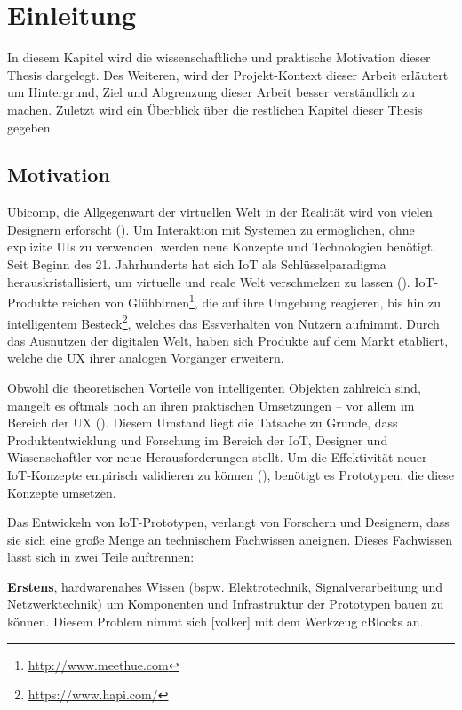 \chapter{Einleitung}\label{sec:1_einleitung}
In diesem Kapitel wird die wissenschaftliche und praktische Motivation dieser Thesis dargelegt. Des Weiteren, wird der Projekt-Kontext dieser Arbeit erläutert um Hintergrund, Ziel und Abgrenzung dieser Arbeit besser verständlich zu machen. Zuletzt wird ein Überblick über die restlichen Kapitel dieser Thesis gegeben.

\section{Motivation}\label{sec:1_motivation}
\ac{Ubicomp}, die Allgegenwart der virtuellen Welt in der Realität wird von vielen Designern erforscht (\cite{Kuniavsky.2010}). Um Interaktion mit Systemen zu ermöglichen, ohne explizite \acp{UI} zu verwenden, werden neue Konzepte und Technologien benötigt. Seit Beginn des 21. Jahrhunderts hat sich \ac{IoT} als Schlüsselparadigma herauskristallisiert, um virtuelle und reale Welt verschmelzen zu lassen (\cite{Gubbi.2013}). \ac{IoT}-Produkte reichen von Glühbirnen\footnote{\url{http://www.meethue.com}}, die auf ihre Umgebung reagieren, bis hin zu intelligentem Besteck\footnote{\url{https://www.hapi.com/}}, welches das Essverhalten von Nutzern aufnimmt. Durch das Ausnutzen der digitalen Welt, haben sich Produkte auf dem Markt etabliert, welche die \ac{UX} ihrer analogen Vorgänger erweitern.

Obwohl die theoretischen Vorteile von intelligenten Objekten zahlreich sind, mangelt es oftmals noch an ihren praktischen Umsetzungen -- vor allem im Bereich der \ac{UX} (\cite{Resnick.2013}). Diesem Umstand liegt die Tatsache zu Grunde, dass Produktentwicklung und Forschung im Bereich der \ac{IoT}, Designer und Wissenschaftler vor neue Herausforderungen stellt. Um die Effektivität neuer \ac{IoT}-Konzepte empirisch validieren zu können (\cite{Robinson.2018}), benötigt es Prototypen, die diese Konzepte umsetzen. 

Das Entwickeln von \ac{IoT}-Prototypen, verlangt von Forschern und Designern, dass sie sich eine große Menge an technischem Fachwissen aneignen. Dieses Fachwissen lässt sich in zwei Teile auftrennen: 

\textbf{Erstens}, hardwarenahes Wissen (bspw. Elektrotechnik, Signalverarbeitung und Netzwerktechnik) um Komponenten und Infrastruktur der Prototypen bauen zu können. Diesem Problem nimmt sich [volker] mit dem Werkzeug \acp{cBlock} an. 


